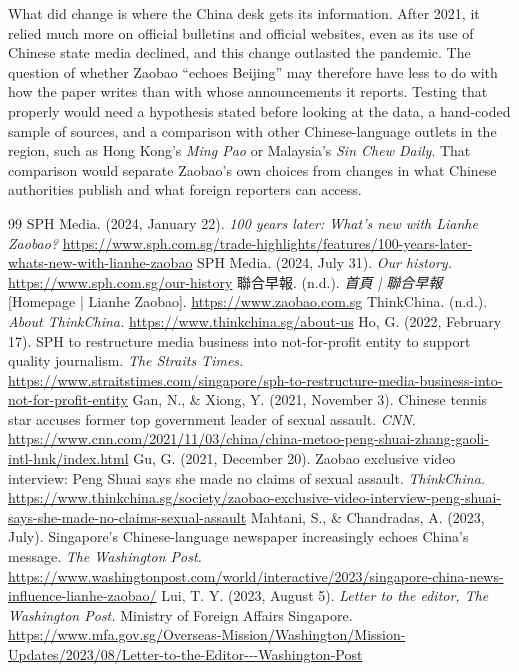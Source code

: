 \documentclass[11pt]{article}
\begin{document}
What did change is where the China desk gets its information. After 2021, it relied much more on official bulletins and official websites, even as its use of Chinese state media declined, and this change outlasted the pandemic. The question of whether Zaobao ``echoes Beijing'' may therefore have less to do with how the paper writes than with whose announcements it reports. Testing that properly would need a hypothesis stated before looking at the data, a hand-coded sample of sources, and a comparison with other Chinese-language outlets in the region, such as Hong Kong's \textit{Ming Pao} or Malaysia's \textit{Sin Chew Daily}. That comparison would separate Zaobao's own choices from changes in what Chinese authorities publish and what foreign reporters can access.

\begin{thebibliography}{99}
\small
\sloppy
{} SPH Media. (2024, January 22). \textit{100 years later: What's new with Lianhe Zaobao?} \url{https://www.sph.com.sg/trade-highlights/features/100-years-later-whats-new-with-lianhe-zaobao}
 SPH Media. (2024, July 31). \textit{Our history.} \url{https://www.sph.com.sg/our-history}
 聯合早報. (n.d.). \textit{首頁 | 聯合早報} [Homepage | Lianhe Zaobao]. \url{https://www.zaobao.com.sg}
 ThinkChina. (n.d.). \textit{About ThinkChina.} \url{https://www.thinkchina.sg/about-us}
 Ho, G. (2022, February 17). SPH to restructure media business into not-for-profit entity to support quality journalism. \textit{The Straits Times.} \url{https://www.straitstimes.com/singapore/sph-to-restructure-media-business-into-not-for-profit-entity}
 Gan, N., \& Xiong, Y. (2021, November 3). Chinese tennis star accuses former top government leader of sexual assault. \textit{CNN.} \url{https://www.cnn.com/2021/11/03/china/china-metoo-peng-shuai-zhang-gaoli-intl-hnk/index.html}
 Gu, G. (2021, December 20). Zaobao exclusive video interview: Peng Shuai says she made no claims of sexual assault. \textit{ThinkChina.} \url{https://www.thinkchina.sg/society/zaobao-exclusive-video-interview-peng-shuai-says-she-made-no-claims-sexual-assault}
 Mahtani, S., \& Chandradas, A. (2023, July). Singapore's Chinese-language newspaper increasingly echoes China's message. \textit{The Washington Post.} \url{https://www.washingtonpost.com/world/interactive/2023/singapore-china-news-influence-lianhe-zaobao/}
 Lui, T. Y. (2023, August 5). \textit{Letter to the editor, The Washington Post.} Ministry of Foreign Affairs Singapore. \url{https://www.mfa.gov.sg/Overseas-Mission/Washington/Mission-Updates/2023/08/Letter-to-the-Editor---Washington-Post}

\end{thebibliography}
\end{document}
